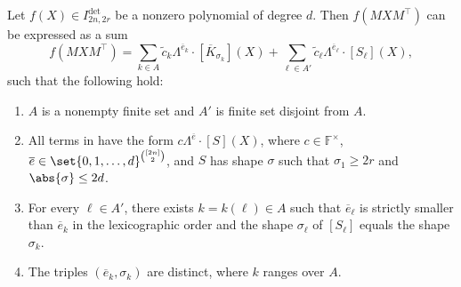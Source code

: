\documentclass[10pt,a4paper]{amsart}
\newcommand*\F{\mathbb{F}}
\begin{document}
\begin{lem}\label{lem:pfaffian_leading_terms_NEW}
Let $f(X) \in I^{\det}_{2n, 2r}$ be a nonzero polynomial of degree $d$.
Then $f(MXM^\top)$ can be expressed as a sum
\begin{equation}\label{eq:expansion1_pfaff}
    f(MXM^\top) = \sum_{k \in A} \widetilde{c}_{k} \Lambda^{\overline{e}_k}\cdot [\overline{K}_{\sigma_k}](X) + \sum_{\ell\in A'} \widetilde{c}_{\ell} \Lambda^{\overline{e}_\ell}\cdot [S_\ell](X),
\end{equation}
such that the following hold:
\begin{enumerate}
    \item\label{item:expansion1_i0_pfaff} $A$ is a nonempty finite set and $A'$ is finite set disjoint from $A$.
    \item\label{item:expansion1_i1_pfaff} All terms in  have the form $c \Lambda^{\overline{e}}\cdot [S](X)$, where $c\in \F^\times$, $\overline{e}\in \set{0, 1, \dots, d}^{\binom{[2n]}{2}}$, and $S$ has shape $\sigma$ such that $\sigma_1 \geq 2r$ and $\abs{\sigma} \leq 2d$.
    \item\label{item:expansion1_i1.5_pfaff} For every $\ell\in A'$, there exists $k=k(\ell)\in A$ such that $\overline{e}_\ell$ is strictly smaller than $\overline{e}_k$ in the lexicographic order and the shape $\sigma_\ell$ of $[S_\ell]$ equals the shape $\sigma_k$.
    \item\label{item:expansion1_i2_pfaff} The triples $(\overline{e}_k,\sigma_k)$ are distinct, where $k$ ranges over $A$.
\end{enumerate} 
\end{lem}
\end{document}
